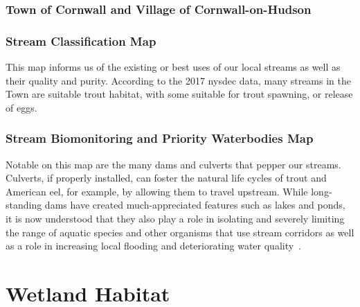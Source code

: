 \subsection*{Town of Cornwall and Village of Cornwall-on-Hudson}
\subsection*{Stream Classification Map}
This map informs us of the existing or best uses of our local streams as well
as their quality and purity. According to the 2017 \gls{nysdec} data, many
streams in the Town are suitable trout habitat, with some suitable for trout
spawning, or release of eggs.

\subsection*{Stream Biomonitoring and Priority Waterbodies Map}
Notable on this map are the many dams and culverts that pepper our streams.
Culverts, if properly installed, can foster the natural life cycles of trout
and American eel, for example, by allowing them to travel upstream. While
long-standing dams have created much-appreciated features such as lakes and
ponds, it is now understood that they also play a role in isolating and
severely limiting the range of aquatic species and other organisms that use
stream corridors as well as a role in increasing local flooding and
deteriorating water quality~\citep{haeckel2014}.

\chapter{Wetland Habitat}
